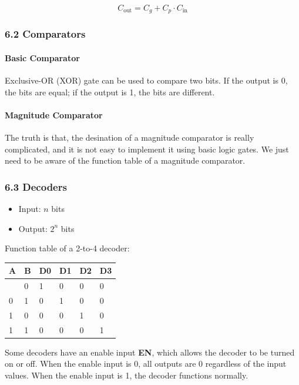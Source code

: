 \documentclass[
  a4paper,
]{article}
\providecommand{\tightlist}{%
  \setlength{\itemsep}{0pt}\setlength{\parskip}{0pt}}
\begin{document}
\[C_{\text{out}} = C_g + C_p \cdot C_{\text{in}} \]

\subsubsection{6.2 Comparators}\label{comparators}

\paragraph{Basic Comparator}\label{basic-comparator}

Exclusive-OR (XOR) gate can be used to compare two bits. If the output
is 0, the bits are equal; if the output is 1, the bits are different.

\paragraph{Magnitude Comparator}\label{magnitude-comparator}

The truth is that, the desination of a magnitude comparator is really
complicated, and it is not easy to implement it using basic logic gates.
We just need to be aware of the function table of a magnitude
comparator.

\subsubsection{6.3 Decoders}\label{decoders}

\begin{itemize}
\tightlist
\item
  Input: \(n\) bits
\item
  Output: \(2^n\) bits
\end{itemize}

Function table of a 2-to-4 decoder:

\begin{longtable}[]{@{}llllll@{}}
\toprule\noalign{}
A & B & D0 & D1 & D2 & D3 \\
\midrule\noalign{}
\endhead
\bottomrule\noalign{}
\endlastfoot
0 & 0 & 1 & 0 & 0 & 0 \\
0 & 1 & 0 & 1 & 0 & 0 \\
1 & 0 & 0 & 0 & 1 & 0 \\
1 & 1 & 0 & 0 & 0 & 1 \\
\end{longtable}

Some decoders have an enable input \textbf{EN}, which allows the decoder
to be turned on or off. When the enable input is 0, all outputs are 0
regardless of the input values. When the enable input is 1, the decoder
functions normally.
\end{document}
